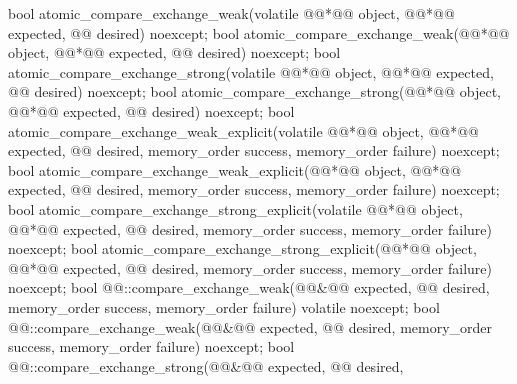 %
%
%
%
%
%
%
%
%
%
\begin{itemdecl}
bool atomic_compare_exchange_weak(volatile @@*@\itcorr[-1]@ object, @@*@\itcorr[-1]@ expected, @@ desired) noexcept;
bool atomic_compare_exchange_weak(@@*@\itcorr[-1]@ object, @@*@\itcorr[-1]@ expected, @@ desired) noexcept;
bool atomic_compare_exchange_strong(volatile @@*@\itcorr[-1]@ object, @@*@\itcorr[-1]@ expected, @@ desired) noexcept;
bool atomic_compare_exchange_strong(@@*@\itcorr[-1]@ object, @@*@\itcorr[-1]@ expected, @@ desired) noexcept;
bool atomic_compare_exchange_weak_explicit(volatile @@*@\itcorr[-1]@ object, @@*@\itcorr[-1]@ expected, @@ desired,
    memory_order success, memory_order failure) noexcept;
bool atomic_compare_exchange_weak_explicit(@@*@\itcorr[-1]@ object, @@*@\itcorr[-1]@ expected, @@ desired,
    memory_order success, memory_order failure) noexcept;
bool atomic_compare_exchange_strong_explicit(volatile @@*@\itcorr[-1]@ object, @@*@\itcorr[-1]@ expected, @@ desired,
    memory_order success, memory_order failure) noexcept;
bool atomic_compare_exchange_strong_explicit(@@*@\itcorr[-1]@ object, @@*@\itcorr[-1]@ expected, @@ desired,
    memory_order success, memory_order failure) noexcept;
bool @@::compare_exchange_weak(@@&@\itcorr[-1]@ expected, @@ desired,
    memory_order success, memory_order failure) volatile noexcept;
bool @@::compare_exchange_weak(@@&@\itcorr[-1]@ expected, @@ desired,
    memory_order success, memory_order failure) noexcept;
bool @@::compare_exchange_strong(@@&@\itcorr[-1]@ expected, @@ desired,

\end{itemdecl}
